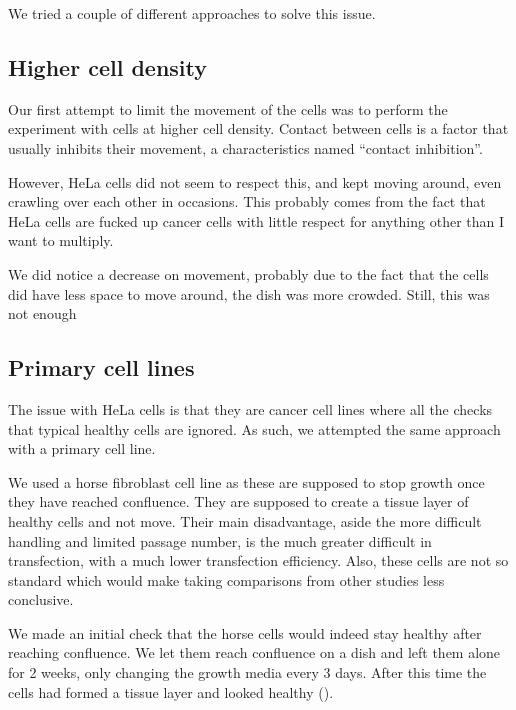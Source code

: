   We tried a couple of different approaches to solve this issue.
  
  \subsection{Higher cell density}
  
    Our first attempt to limit the movement of the cells was to perform the experiment with
    cells at higher cell density.  Contact between cells is a factor that usually inhibits
    their movement, a characteristics named ``contact inhibition''.
    
    However, HeLa cells did not seem to respect this, and kept moving around, even crawling
    over each other in occasions. This probably comes from the fact that HeLa cells are fucked
    up cancer cells with little respect for anything other than I want to multiply.
    
    We did notice a decrease on movement, probably due to the fact that the cells did have less
    space to move around, the dish was more crowded. Still, this was not enough

  \subsection{Primary cell lines}
  \label{sec:frap-movement-horse}
  
    The issue with HeLa cells is that they are cancer cell lines where all the checks that typical
    healthy cells are ignored. As such, we attempted the same approach with a primary cell line.
    
    We used a horse fibroblast cell line as these are supposed to stop growth once they have reached
    confluence. They are supposed to create a tissue layer of healthy cells and not move. Their main
    disadvantage, aside the more difficult handling and limited passage number, is the much greater
    difficult in transfection, with a much lower transfection efficiency. Also, these cells are not
    so standard which would make taking comparisons from other studies less conclusive.
    
    We made an initial check that the horse cells would indeed stay healthy after reaching confluence.
    We let them reach confluence on a dish and left them alone for 2 weeks, only changing the growth
    media every 3 days. After this time the cells had formed a tissue layer and looked healthy ().
    
